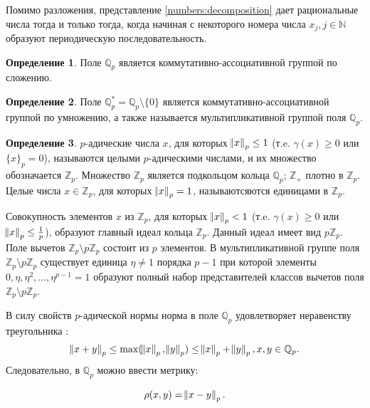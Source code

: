 \documentclass[master, och, diploma, times]{sty/SCWorks}
\theoremstyle{plain}
\theoremstyle{definition}
\newtheorem{defn}{Определение}[section]
\numberwithin{equation}{section}
\begin{document}
Помимо разложения, представление \eqref{numbers:decomposition} дает рациональные числа тогда и только тогда, когда начиная с некоторого номера числа $x_j, j \in \mathbb{N}$ образуют периодическую последовательность.

\begin{defn}
Поле $\mathbb {Q}_p$ является коммутативно-ассоциативной группой по сложению.
\end{defn}

\begin{defn}
Поле $\mathbb {Q}_p^*=\mathbb {Q}_p \setminus \{0\}$ является коммутативно-ассоциативной группой по умножению, а также называется мультипликативной группой поля $\mathbb {Q}_p$\cite{bib:analysis:baker}.
\end{defn}

\begin{defn}
$p$-адические числа $x$, для которых $\norm{x}_p \le 1$ (т.e. $\gamma(x) \ge 0$ или $\{x\}_p=0$), называются целыми $p$-адическими числами, и их множество обозначается $\mathbb {Z}_p$. Множество $\mathbb {Z}_p$ является подкольцом кольца $\mathbb {Q}_p$; $\mathbb {Z}_+$ плотно в $\mathbb {Z}_p$. Целые числа $x \in \mathbb {Z}_p$, для которых $\norm{x}_p=1$, называютсяются единицами в $\mathbb {Z}_p$. \cite{bib:analysis:vladimirov}
\end{defn}

Совокупность элементов $x$ из $\mathbb {Z}_p$, для которых $\norm{x}_p < 1$ (т.e. $\gamma(x) \ge 0$ или $\norm{x}_p \le \frac{1}{p}$), образуют главный идеал кольца $\mathbb {Z}_p$. Данный идеал имеет вид $p\mathbb {Z}_p$. Поле вычетов $\mathbb {Z}_p \setminus p\mathbb {Z}_p$ состоит из $p$ элементов. В мультипликативной группе поля $\mathbb {Z}_p \setminus p\mathbb {Z}_p$ существует единица $\eta \ne 1$ порядка $p-1$ при которой элементы $0, \eta, \eta^2, \dots, \eta^{p-1} = 1$ образуют полный набор представителей классов вычетов поля $\mathbb {Z}_p \setminus p\mathbb {Z}_p$.

В силу свойств $p$-адической нормы норма в поле $\mathbb {Q}_p$ удовлетворяет неравенству треугольника \cite{bib:analisys:albeverio}:
\begin{equation}
\norm{x + y}_p \le \max(\norm{x}_p, \norm{y}_p) \le \norm{x}_p + \norm{y}_p, x,y \in \mathbb {Q}_p.
\end{equation}
\noindent Следовательно, в $\mathbb {Q}_p$ можно ввести метрику:

\begin{equation}
	\rho (x,y)=\norm{x-y}_p.
\end{equation}
\end{document}
